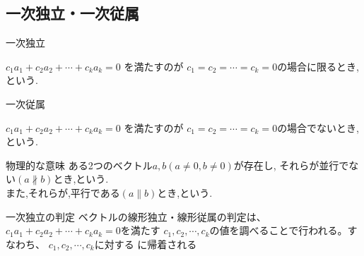 \documentclass[a4paper]{jsarticle}
\begin{document}
\subsection{一次独立・一次従属}
\begin{itembox}[l]{一次独立}
    \begin{center}
        $c_1a_1+c_2a_2+\cdots+c_ka_k=0$ を満たすのが $c_1=c_2=\cdots=c_k=0$の場合に限るとき,
        という.
    \end{center}
\end{itembox}
\begin{itembox}[l]{一次従属}
    \begin{center}
        $c_1a_1+c_2a_2+\cdots+c_ka_k=0$ を満たすのが $c_1=c_2=\cdots=c_k=0$の場合でないとき,
        という.
    \end{center}
\end{itembox}
\begin{itembox}[l]{物理的な意味}
    ある2つのベクトル$a,b\left(a\neq 0,b\neq 0\right)$が存在し,
    それらが並行でない$\left(a\not\parallel b\right)$とき,という.\\
    また,それらが,平行である$\left(a\parallel b\right)$とき,という.
\end{itembox}
\begin{itembox}[l]{一次独立の判定}
    ベクトルの線形独立・線形従属の判定は、$c_1a_1+c_2a_2+\cdots+c_ka_k=0$を満たす
    $c_1,c_2,\cdots,c_k$の値を調べることで行われる。すなわち、 $c_1,c_2,\cdots,c_k$に対する
    に帰着される
\end{itembox}
\end{document}

